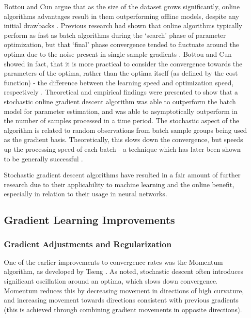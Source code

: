 \documentclass[a4paper,11pt,oneside]{article}
\theoremstyle{plain}
\theoremstyle{definition}
\begin{document}
	Bottou and Cun argue that as the size of the dataset grows significantly, online algorithms advantages result in 
	them outperforming offline models, despite any initial drawbacks \cite{Bottou}. Previous research had shown that online 
	algorithms typically perform as fast as batch algorithms during the ‘search’ phase of parameter optimization, but 
	that ‘final’ phase convergence tended to fluctuate around the optima due to the noise present in single sample 
	gradients \cite{LeCun, Bottou2}. Bottou and Cun showed in fact, that it is more practical to consider the convergence towards
	the parameters of the optima, rather than the optima itself (as defined by the cost function) - the difference 
	between the learning speed and optimization speed, respectively \cite{Bottou}. Theoretical and empirical findings were 
	presented to show that a stochastic online gradient descent algorithm was able to 
	outperform the batch model for parameter estimation, and was able to asymptotically outperform in the number of 
	samples processed in a time period. The stochastic aspect of the algorithm is related to random observations 
	from batch sample groups being used as the gradient basis. Theoretically, this slows down the convergence, but 
	speeds up the processing speed of each batch - a technique which has later been shown to be generally 
	successful \cite{Shalev, Zhang}. 
	\hfill\break
	
	Stochastic gradient descent algorithms have resulted in a fair amount of further research due to their applicability to machine learning 
	and the online benefit, especially in relation to their usage in neural networks.
	\hfill\break
	
	\subsection{Gradient Learning Improvements}\label{lr_grad_improv}
	
	\subsubsection{Gradient Adjustments and Regularization}
	
	One of the earlier improvements to convergence rates was the Momentum algorithm, as developed by Tseng \cite{Tseng}. 
	As noted, stochastic descent often introduces significant oscillation around an optima, which slows down 
	convergence. Momentum reduces this by decreasing movement in directions of high curvature, and  
	increasing movement towards directions consistent with previous gradients (this is achieved through combining 
	gradient movements in opposite directions).
	\hfill\break
	
\end{document}
